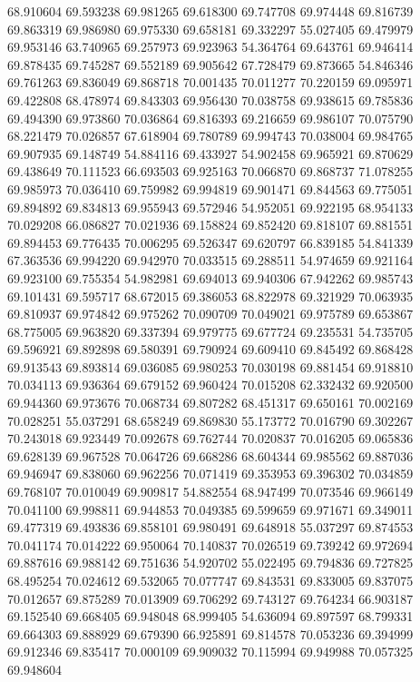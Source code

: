 68.910604
69.593238
69.981265
69.618300
69.747708
69.974448
69.816739
69.863319
69.986980
69.975330
69.658181
69.332297
55.027405
69.479979
69.953146
63.740965
69.257973
69.923963
54.364764
69.643761
69.946414
69.878435
69.745287
69.552189
69.905642
67.728479
69.873665
54.846346
69.761263
69.836049
69.868718
70.001435
70.011277
70.220159
69.095971
69.422808
68.478974
69.843303
69.956430
70.038758
69.938615
69.785836
69.494390
69.973860
70.036864
69.816393
69.216659
69.986107
70.075790
68.221479
70.026857
67.618904
69.780789
69.994743
70.038004
69.984765
69.907935
69.148749
54.884116
69.433927
54.902458
69.965921
69.870629
69.438649
70.111523
66.693503
69.925163
70.066870
69.868737
71.078255
69.985973
70.036410
69.759982
69.994819
69.901471
69.844563
69.775051
69.894892
69.834813
69.955943
69.572946
54.952051
69.922195
68.954133
70.029208
66.086827
70.021936
69.158824
69.852420
69.818107
69.881551
69.894453
69.776435
70.006295
69.526347
69.620797
66.839185
54.841339
67.363536
69.994220
69.942970
70.033515
69.288511
54.974659
69.921164
69.923100
69.755354
54.982981
69.694013
69.940306
67.942262
69.985743
69.101431
69.595717
68.672015
69.386053
68.822978
69.321929
70.063935
69.810937
69.974842
69.975262
70.090709
70.049021
69.975789
69.653867
68.775005
69.963820
69.337394
69.979775
69.677724
69.235531
54.735705
69.596921
69.892898
69.580391
69.790924
69.609410
69.845492
69.868428
69.913543
69.893814
69.036085
69.980253
70.030198
69.881454
69.918810
70.034113
69.936364
69.679152
69.960424
70.015208
62.332432
69.920500
69.944360
69.973676
70.068734
69.807282
68.451317
69.650161
70.002169
70.028251
55.037291
68.658249
69.869830
55.173772
70.016790
69.302267
70.243018
69.923449
70.092678
69.762744
70.020837
70.016205
69.065836
69.628139
69.967528
70.064726
69.668286
68.604344
69.985562
69.887036
69.946947
69.838060
69.962256
70.071419
69.353953
69.396302
70.034859
69.768107
70.010049
69.909817
54.882554
68.947499
70.073546
69.966149
70.041100
69.998811
69.944853
70.049385
69.599659
69.971671
69.349011
69.477319
69.493836
69.858101
69.980491
69.648918
55.037297
69.874553
70.041174
70.014222
69.950064
70.140837
70.026519
69.739242
69.972694
69.887616
69.988142
69.751636
54.920702
55.022495
69.794836
69.727825
68.495254
70.024612
69.532065
70.077747
69.843531
69.833005
69.837075
70.012657
69.875289
70.013909
69.706292
69.743127
69.764234
66.903187
69.152540
69.668405
69.948048
68.999405
54.636094
69.897597
68.799331
69.664303
69.888929
69.679390
66.925891
69.814578
70.053236
69.394999
69.912346
69.835417
70.000109
69.909032
70.115994
69.949988
70.057325
69.948604

